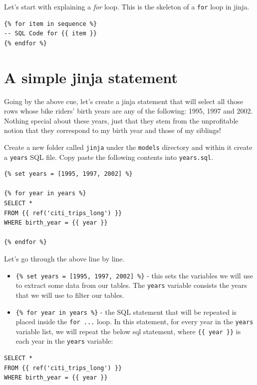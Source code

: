 \documentclass[
]{book}
\begin{document}
Let's start with explaining a \emph{for} loop. This is the skeleton of a \texttt{for} loop in jinja.

\begin{verbatim}
{% for item in sequence %}
-- SQL Code for {{ item }}
{% endfor %}
\end{verbatim}

\hypertarget{a-simple-jinja-statement}{%
\section{A simple jinja statement}\label{a-simple-jinja-statement}}

Going by the above cue, let's create a jinja statement that will select all those rows whose bike riders' birth years are any of the following: 1995, 1997 and 2002. Nothing special about these years, just that they stem from the unprofitable notion that they correspond to my birth year and those of my siblings!

Create a new folder called \texttt{jinja} under the \texttt{models} directory and within it create a \texttt{years} SQL file. Copy paste the following contents into \texttt{years.sql}.

\begin{verbatim}
{% set years = [1995, 1997, 2002] %}

{% for year in years %}
SELECT * 
FROM {{ ref('citi_trips_long') }}
WHERE birth_year = {{ year }}

{% endfor %}
\end{verbatim}

Let's go through the above line by line.

\begin{itemize}
\item
  \texttt{\{\%\ set\ years\ =\ {[}1995,\ 1997,\ 2002{]}\ \%\}} - this sets the variables we will use to extract some data from our tables. The \texttt{years} variable consists the years that we will use to filter our tables.
\item
  \texttt{\{\%\ for\ year\ in\ years\ \%\}} - the SQL statement that will be repeated is placed inside the \texttt{for\ ...} loop. In this statement, for every year in the \texttt{years} variable list, we will repeat the below sql statement, where \texttt{\{\{\ year\ \}\}} is each year in the \texttt{years} variable:
\end{itemize}

\begin{verbatim}
SELECT * 
FROM {{ ref('citi_trips_long') }}
WHERE birth_year = {{ year }}
\end{verbatim}
\end{document}
